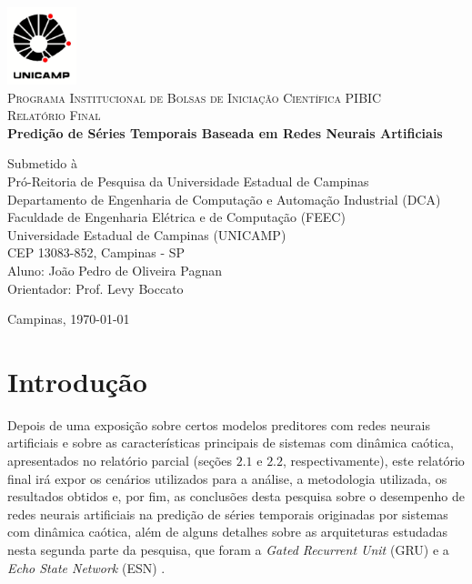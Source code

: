 \documentclass[a4paper, 12pt]{article}
\begin{document}
\begin{titlepage}
\newcommand{\HRule}{\rule{\linewidth}{1.5mm}}
	
\center

\includegraphics[width=0.15\textwidth]{logo-unicamp.pdf}\\[1.0cm]

\textsc{\Large Programa Institucional de Bolsas de Iniciação Científica PIBIC}\\[0.5cm]

\textsc{\large Relatório Final}\\[1.5cm]

{\Large \bfseries Predição de Séries Temporais Baseada em Redes Neurais Artificiais}\\[2.5cm]

\begin{flushleft}
Submetido à \\ Pró-Reitoria de Pesquisa da Universidade Estadual de Campinas\\[1.5cm]

Departamento de Engenharia de Computação e Automação Industrial (DCA)\\
Faculdade de Engenharia Elétrica e de Computação (FEEC)\\
Universidade Estadual de Campinas (UNICAMP)\\
CEP 13083-852, Campinas - SP\\[1.0cm]

Aluno: João Pedro de Oliveira Pagnan\\
Orientador: Prof. Levy Boccato \\[4.5cm]
\end{flushleft}	
	
Campinas, \today

\end{titlepage}

\newpage

\section{Introdução}

Depois de uma exposição sobre certos modelos preditores com redes neurais artificiais e sobre as características principais de sistemas com dinâmica caótica, apresentados no relatório parcial (seções $2.1$ e $2.2$, respectivamente), este relatório final irá expor os cenários utilizados para a análise, a metodologia utilizada, os resultados obtidos e, por fim, as conclusões desta pesquisa sobre o desempenho de redes neurais artificiais na predição de séries temporais originadas por sistemas com dinâmica caótica, além de alguns detalhes sobre as arquiteturas estudadas nesta segunda parte da pesquisa, que foram a \textit{Gated Recurrent Unit} (GRU) \cite{cho2014learning} e a \textit{Echo State Network} (ESN) \cite{jaeger2007echo}. 
\end{document}
